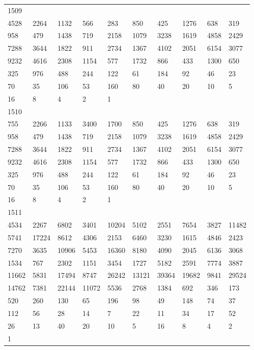 \begin{longtable}{*{10}{l}}
1509&&&&&&&&&\\
4528& 2264& 1132& 566& 283& 850& 425& 1276& 638& 319\\
958& 479& 1438& 719& 2158& 1079& 3238& 1619& 4858& 2429\\
7288& 3644& 1822& 911& 2734& 1367& 4102& 2051& 6154& 3077\\
9232& 4616& 2308& 1154& 577& 1732& 866& 433& 1300& 650\\
325& 976& 488& 244& 122& 61& 184& 92& 46& 23\\
70& 35& 106& 53& 160& 80& 40& 20& 10& 5\\
16& 8& 4& 2& 1& \\

1510&&&&&&&&&\\
755& 2266& 1133& 3400& 1700& 850& 425& 1276& 638& 319\\
958& 479& 1438& 719& 2158& 1079& 3238& 1619& 4858& 2429\\
7288& 3644& 1822& 911& 2734& 1367& 4102& 2051& 6154& 3077\\
9232& 4616& 2308& 1154& 577& 1732& 866& 433& 1300& 650\\
325& 976& 488& 244& 122& 61& 184& 92& 46& 23\\
70& 35& 106& 53& 160& 80& 40& 20& 10& 5\\
16& 8& 4& 2& 1& \\

1511&&&&&&&&&\\
4534& 2267& 6802& 3401& 10204& 5102& 2551& 7654& 3827& 11482\\
5741& 17224& 8612& 4306& 2153& 6460& 3230& 1615& 4846& 2423\\
7270& 3635& 10906& 5453& 16360& 8180& 4090& 2045& 6136& 3068\\
1534& 767& 2302& 1151& 3454& 1727& 5182& 2591& 7774& 3887\\
11662& 5831& 17494& 8747& 26242& 13121& 39364& 19682& 9841& 29524\\
14762& 7381& 22144& 11072& 5536& 2768& 1384& 692& 346& 173\\
520& 260& 130& 65& 196& 98& 49& 148& 74& 37\\
112& 56& 28& 14& 7& 22& 11& 34& 17& 52\\
26& 13& 40& 20& 10& 5& 16& 8& 4& 2\\
1& \\


\end{longtable}
